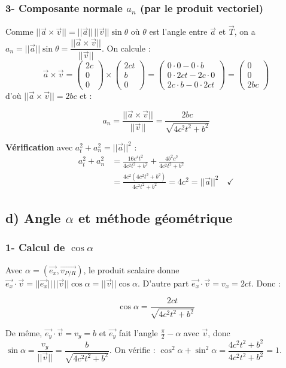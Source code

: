 \documentclass[11pt,a4paper]{article}
\begin{document}
\subsubsection*{3- Composante normale $a_n$ (par le produit vectoriel)}
Comme $||\vec{a}\times\vec{v}|| = ||\vec{a}||\,||\vec{v}||\sin\theta$ où $\theta$ est l'angle entre $\vec{a}$ et $\vec{T}$, on a $a_n = ||\vec{a}||\sin\theta = \dfrac{||\vec{a}\times\vec{v}||}{||\vec{v}||}$. On calcule :
$$ \vec{a}\times\vec{v} = \begin{pmatrix} 2c \\ 0 \\ 0 \end{pmatrix}\times\begin{pmatrix} 2ct \\ b \\ 0 \end{pmatrix} = \begin{pmatrix} 0\cdot 0 - 0\cdot b \\ 0\cdot 2ct - 2c\cdot 0 \\ 2c\cdot b - 0\cdot 2ct \end{pmatrix} = \begin{pmatrix} 0 \\ 0 \\ 2bc \end{pmatrix} $$
d'où $||\vec{a}\times\vec{v}|| = 2bc$ et :
\begin{sonucbox}
$$ a_n = \frac{||\vec{a}\times\vec{v}||}{||\vec{v}||} = \frac{2bc}{\sqrt{4c^2t^2 + b^2}} $$
\end{sonucbox}
\textbf{Vérification} avec $a_t^2 + a_n^2 = ||\vec{a}||^2$ :
\begin{align*}
a_t^2 + a_n^2 &= \frac{16c^4t^2}{4c^2t^2 + b^2} + \frac{4b^2c^2}{4c^2t^2 + b^2} \\
&= \frac{4c^2\left(4c^2t^2 + b^2\right)}{4c^2t^2 + b^2} = 4c^2 = ||\vec{a}||^2 \quad \checkmark
\end{align*}

\subsection*{d) Angle $\alpha$ et méthode géométrique}

\subsubsection*{1- Calcul de $\cos\alpha$}
Avec $\alpha = (\vec{e_x}, \vec{v_{P/R}})$, le produit scalaire donne $\vec{e_x}\cdot\vec{v} = ||\vec{e_x}||\,||\vec{v}||\cos\alpha = ||\vec{v}||\cos\alpha$. D'autre part $\vec{e_x}\cdot\vec{v} = v_x = 2ct$. Donc :
\begin{sonucbox}
$$ \cos\alpha = \frac{2ct}{\sqrt{4c^2t^2 + b^2}} $$
\end{sonucbox}
De même, $\vec{e_y}\cdot\vec{v} = v_y = b$ et $\vec{e_y}$ fait l'angle $\frac{\pi}{2}-\alpha$ avec $\vec{v}$, donc $\sin\alpha = \dfrac{v_y}{||\vec{v}||} = \dfrac{b}{\sqrt{4c^2t^2 + b^2}}$. On vérifie : $\cos^2\alpha + \sin^2\alpha = \dfrac{4c^2t^2 + b^2}{4c^2t^2 + b^2} = 1$.
\end{document}
